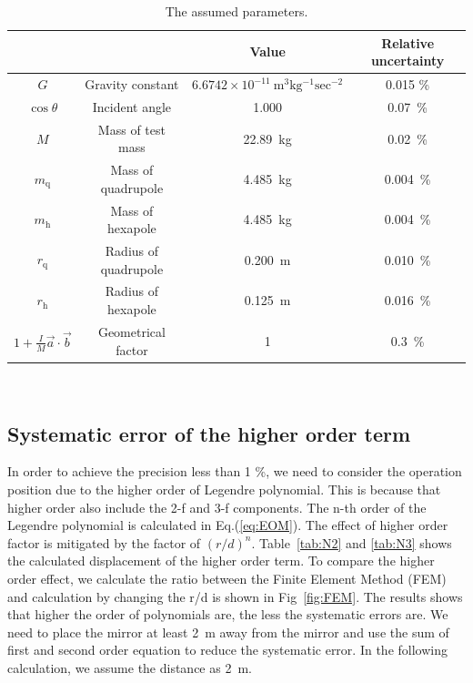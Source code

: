 \documentclass[A4]{spie}  %
\begin{document}
\begin{table}
\begin{center}
\caption{\label{sus}The assumed parameters.}
\footnotesize
\begin{tabular}{cccc}
\hline
&&Value&Relative uncertainty \\
\hline
$G$& Gravity constant&$6.6742 \times 10^{-11}~\mathrm{m^3kg^{-1}sec^{-2}}$&0.015 \%\\
$\cos{\theta}$& Incident angle&1.000& 0.07~\%\\
$M$& Mass of test mass&22.89~kg & 0.02~\%\\
$m_{\mathrm{q}}$&Mass of quadrupole&4.485~kg & 0.004~\%\\
$m_{\mathrm{h}}$&Mass of hexapole& 4.485~kg &0.004~\%\\
$r_{\mathrm{q}}$&Radius of quadrupole&0.200~m & 0.010~\%\\
$r_{\mathrm{h}}$&Radius of hexapole& 0.125~m & 0.016~\%\\
$1+\frac{I}{M}\vec{a}\cdot \vec{b}$& Geometrical factor & 1&0.3~\% \\
\hline
\end{tabular}\\
\end{center}
\end{table}

\subsection{Systematic error of the higher order term}
In order to achieve the precision less than 1 \%, we need to consider the operation position due to the higher order of Legendre polynomial. This is because that higher order also include the 2-f and 3-f components. The n-th order of the Legendre polynomial is calculated in Eq.(\ref{eq:EOM}). The effect of higher order factor is mitigated by the factor of $(r/d)^n$. Table~\ref{tab:N2} and \ref{tab:N3} shows the calculated displacement of the higher order term. To compare the higher order effect, we calculate the ratio between the Finite Element Method (FEM) and calculation by changing the r/d is shown in Fig~\ref{fig:FEM}. The results shows that higher the order of polynomials are, the less the systematic errors are. We need to place the mirror at least 2~m away from the mirror and use the sum of first and second order equation to reduce the systematic error. In the following calculation, we assume the distance as 2~m. 
\end{document}
